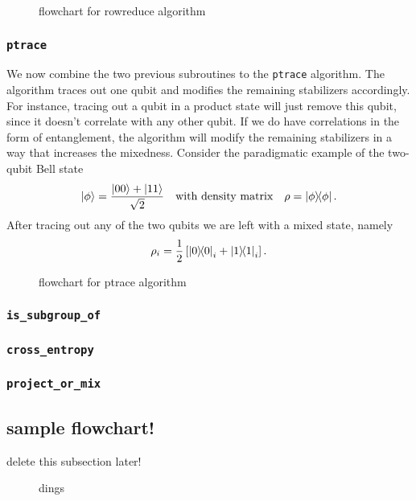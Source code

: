 \begin{figure}[H]
  \centering
  
  \caption{flowchart for rowreduce algorithm}
  \label{fig:rowreduce-diag}
\end{figure}

\subsubsection{\texttt{ptrace}}\label{sec:ptrace}
We now combine the two previous subroutines to the \verb|ptrace| algorithm.
The algorithm traces out one qubit and modifies the remaining stabilizers
accordingly. For instance, tracing out a qubit in a product state will just
remove this qubit, since it doesn't correlate with any other qubit. If we do
have correlations in the form of entanglement, the algorithm will modify the
remaining stabilizers in a way that increases the mixedness. 
Consider the paradigmatic example of the two-qubit Bell state
\[
  \ket{\phi} = \frac{\ket{00} + \ket{11}}{\sqrt{2}} \quad{\text{with density
  matrix}} \quad \rho = \dyad{\phi}.
\]
After tracing out any of the two qubits we are left with a mixed state, namely
$$\rho_i = \frac{1}{2} \left[\dyad{0}_i + \dyad{1}_i\right].$$


\begin{figure}[h]
  \centering
  
  \caption{flowchart for ptrace algorithm}
  \label{fig:ptrace-dig}
\end{figure}

\subsubsection{\texttt{is\_subgroup\_of}}

\subsubsection{\texttt{cross\_entropy}}

\subsubsection{\texttt{project\_or\_mix}}


\subsection{sample flowchart!}
delete this subsection later!
\begin{figure}[H]
  \centering
  
  \caption{dings}
  \label{fig:asdf}
\end{figure}
